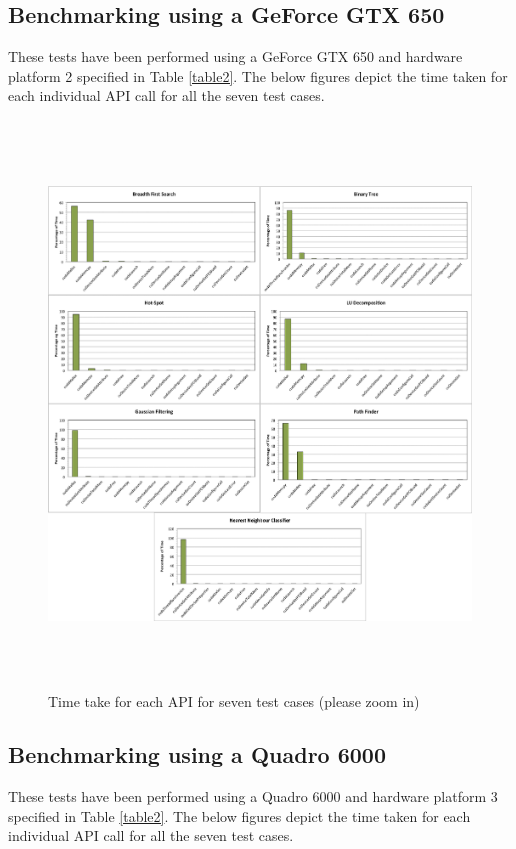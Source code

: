 \documentclass[paper=a4, fontsize=11pt]{scrartcl}
\numberwithin{equation}{section}		%
\numberwithin{figure}{section}			%
\numberwithin{table}{section}				%
\begin{document}
\newpage
\subsection{Benchmarking using a GeForce GTX 650}
These tests have been performed using a GeForce GTX 650 and hardware platform 2 specified in Table \ref{table2}. The below figures depict the time taken for each individual API call for all the seven test cases.

\begin{figure}[!h]
\centering
\includegraphics[width=1\textwidth,height=15cm]{../imgs/x650.pdf}
\caption{Time take for each API for seven test cases (please zoom in)}
\label{fig:x650}
\end{figure}

\newpage
\subsection{Benchmarking using a Quadro 6000}
These tests have been performed using a Quadro 6000 and hardware platform 3 specified in Table \ref{table2}. The below figures depict the time taken for each individual API call for all the seven test cases.
\end{document}
